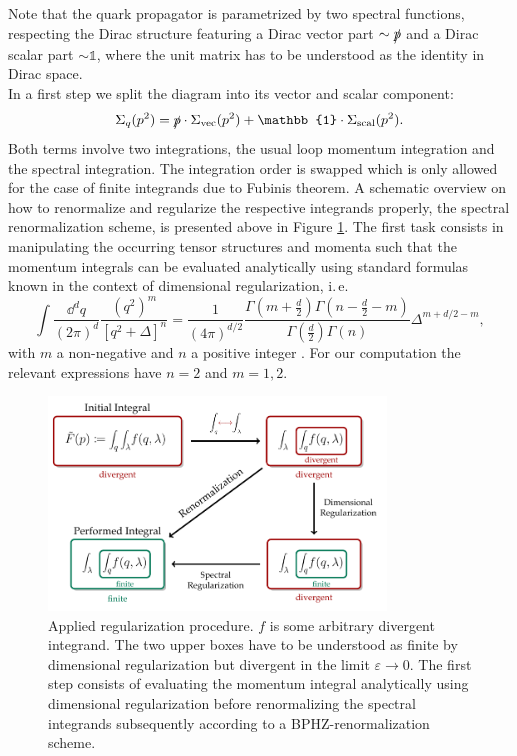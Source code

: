Note that the quark propagator is parametrized by two spectral functions, respecting the Dirac structure featuring a Dirac vector part $\sim \slashed{p}$ and a Dirac scalar part $\sim \mathbb{1}$, where the unit matrix has to be understood as the identity in Dirac space.\\
In a first step we split the diagram into its vector and scalar component:
\begin{equation}
	\Sigma_q(p^2) = \slashed{p}\cdot\Sigma_{\mathrm{vec}}(p^2) + \mathbb{1}\cdot\Sigma_{\mathrm{scal}}(p^2).
\end{equation}
Both terms involve two integrations, the usual loop momentum integration and the spectral integration. The integration order is swapped which is only allowed for the case of finite integrands due to Fubinis theorem. A schematic overview on how to renormalize and regularize the respective integrands properly, the spectral renormalization scheme, is presented above in Figure \ref{fig:spectral_renormalization}. The first task consists in manipulating the occurring tensor structures and momenta such that the momentum integrals can be evaluated analytically using standard formulas known in the context of dimensional regularization, i.\,e.
\begin{equation}
	\int\frac{\dd^d q}{(2\pi)^d}\frac{(q^2)^m}{\left[q^2 + \Delta\right]^n} = \frac{1}{(4\pi)^{d/2}}\frac{\Gamma(m+\frac{d}{2})\Gamma(n-\frac{d}{2}-m)}{\Gamma(\frac{d}{2})\Gamma(n)} \Delta^{m+d/2-m},
\end{equation} 
with $m$ a non-negative and $n$ a positive integer \cite{PeskinSchroeder1995}. For our computation the relevant expressions have $n=2$ and $m= 1,2$.
\begin{figure}[t]
\centering
\includegraphics[width=0.8\textwidth]{figures/spectral_renormalization}
\caption[Applied regularization procedure.]{Applied regularization procedure. $f$ is some arbitrary divergent integrand. The two upper boxes have to be understood as finite by dimensional regularization but divergent in the limit $\varepsilon\rightarrow 0$. The first step consists of evaluating the momentum integral analytically using dimensional regularization before renormalizing the spectral integrands subsequently according to a BPHZ-renormalization scheme.}\label{fig:spectral_renormalization}
\end{figure}
